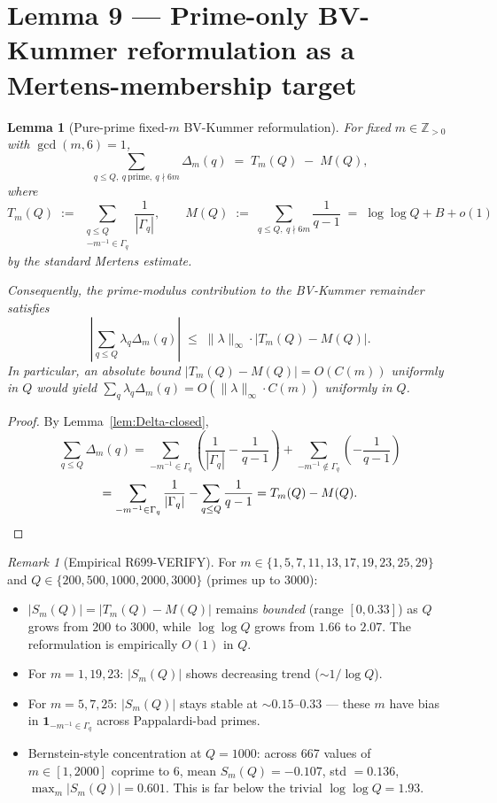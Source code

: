 \documentclass[12pt]{amsart}
\newtheorem{lemma}{Lemma}
\theoremstyle{definition}
\theoremstyle{remark}
\newtheorem{remark}{Remark}
\begin{document}
\section{Lemma 9 --- Prime-only BV-Kummer reformulation as a Mertens-membership target}

\begin{lemma}[Pure-prime fixed-$m$ BV-Kummer reformulation]\label{lem:Mertens}
For fixed $m \in \mathbb{Z}_{> 0}$ with $\gcd(m, 6) = 1$,
$$
\sum_{q \le Q,\ q\ \text{prime},\ q \nmid 6m} \Delta_m(q)
\;=\;
T_m(Q) \;-\; M(Q),
$$
where
$$
T_m(Q)
\;:=\;
\sum_{\substack{q \le Q \\ -m^{-1} \in \Gamma_q}}
\frac{1}{|\Gamma_q|},
\qquad
M(Q)
\;:=\;
\sum_{q \le Q,\ q \nmid 6m}
\frac{1}{q - 1}
\;=\;
\log\log Q + B + o(1)
$$
by the standard Mertens estimate.

Consequently, the prime-modulus contribution to the BV-Kummer remainder satisfies
$$
\left| \sum_{q \le Q} \lambda_q \Delta_m(q) \right|
\;\le\;
\|\lambda\|_\infty \cdot |T_m(Q) - M(Q)|.
$$
In particular, an absolute bound $|T_m(Q) - M(Q)| = O(C(m))$ uniformly in $Q$ would yield
$\sum_q \lambda_q \Delta_m(q) = O(\|\lambda\|_\infty \cdot C(m))$ uniformly in $Q$.
\end{lemma}

\begin{proof}
By Lemma~\ref{lem:Delta-closed},
$$
\sum_{q \le Q} \Delta_m(q)
=
\sum_{-m^{-1} \in \Gamma_q} \left( \frac{1}{|\Gamma_q|} - \frac{1}{q - 1} \right)
+
\sum_{-m^{-1} \notin \Gamma_q} \left( -\frac{1}{q - 1} \right)
$$
$$
=
\sum_{-m^{-1} \in \Gamma_q} \frac{1}{|\Gamma_q|}
-
\sum_{q \le Q} \frac{1}{q - 1}
=
T_m(Q) - M(Q). \qedhere
$$
\end{proof}

\begin{remark}[Empirical R699-VERIFY]
For $m \in \{1, 5, 7, 11, 13, 17, 19, 23, 25, 29\}$ and $Q \in \{200, 500, 1000, 2000, 3000\}$ (primes up to 3000):
\begin{itemize}
\item $|S_m(Q)| = |T_m(Q) - M(Q)|$ remains \emph{bounded} (range $[0, 0.33]$) as $Q$ grows from $200$ to $3000$, while $\log\log Q$ grows from $1.66$ to $2.07$. The reformulation is empirically $O(1)$ in $Q$.
\item For $m = 1, 19, 23$: $|S_m(Q)|$ shows decreasing trend ($\sim 1/\log Q$).
\item For $m = 5, 7, 25$: $|S_m(Q)|$ stays stable at $\sim 0.15$--$0.33$ — these $m$ have bias in $\mathbf{1}_{-m^{-1} \in \Gamma_q}$ across Pappalardi-bad primes.
\item Bernstein-style concentration at $Q = 1000$: across 667 values of $m \in [1, 2000]$ coprime to 6, mean $S_m(Q) = -0.107$, std $= 0.136$, $\max_m |S_m(Q)| = 0.601$. This is far below the trivial $\log\log Q = 1.93$.
\end{itemize}
\end{remark}
\end{document}

